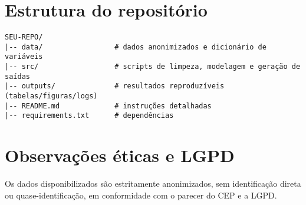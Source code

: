 \begin{apendicesenv}
\section{Estrutura do repositório}
\begin{verbatim}
SEU-REPO/
|-- data/                 # dados anonimizados e dicionário de variáveis
|-- src/                  # scripts de limpeza, modelagem e geração de saídas
|-- outputs/              # resultados reproduzíveis (tabelas/figuras/logs)
|-- README.md             # instruções detalhadas
|-- requirements.txt      # dependências
\end{verbatim}

\section{Observações éticas e LGPD}
Os dados disponibilizados são estritamente anonimizados, sem identificação direta ou
quase-identificação, em conformidade com o parecer do CEP e a LGPD.


\end{apendicesenv}
